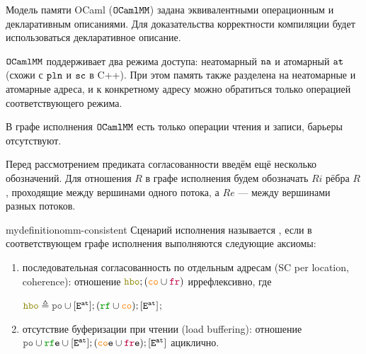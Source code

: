 Модель памяти OCaml ($\mathtt{OCaml}\allowbreak \mathtt{MM}$) \cite{omm} задана эквивалентными операционным и декларативным описаниями. Для доказательства корректности компиляции будет использоваться декларативное описание.

$\mathtt{OCaml}\allowbreak \mathtt{MM}$ поддерживает два режима доступа: неатомарный ${\mathtt{na}}$ и атомарный ${\mathtt{at}}$ (схожи с $\mathtt{pln}$ и ${\mathtt{sc}}$ в C++). При этом память также разделена на неатомарные и атомарные адреса, и к конкретному адресу можно обратиться только операцией соответствующего режима.

В графе исполнения $\mathtt{OCaml}\allowbreak \mathtt{MM}$ есть только операции чтения и записи, барьеры отсутствуют.

Перед рассмотрением предиката согласованности введём ещё несколько обозначений. Для отношения $R$ в графе исполнения будем обозначать $Ri$ рёбра $R$, проходящие между вершинами одного потока, а $Re$ --- между вершинами разных потоков. 

\begin{restatable}{mydefinition}{omm-consistent}
  Сценарий исполнения называется , если в соответствующем графе исполнения выполняются следующие аксиомы:

  \begin{enumerate}
  \item последовательная согласованность по отдельным адресам (SC per location, coherence): отношение $\lHBO ; (\lCO \cup \lFR)$ иррефлексивно, где

    $\lHBO \defeq \lPO \cup [\lE^{\at}] ; (\lRF \cup \lCO) ; [\lE^{\at}]$;
    
  \item отсутствие буферизации при чтении (load buffering): отношение $\lPO \cup \lRFE \cup [\lE^{\at}] ; (\lCOE \cup \lFRE) ; [\lE^{\at}]$ ациклично.
  \end{enumerate}
\end{restatable}




